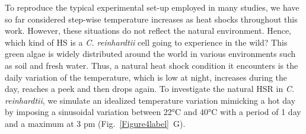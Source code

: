 \documentclass[oneside, 10pt, a4paper, twocolumn]{article}
\begin{document}


To reproduce the typical experimental set-up employed in many studies, we have so far considered step-wise temperature increases as heat shocks throughout this work. %
However, these situations do not reflect the natural environment.
Hence, which kind of HS is a \emph{C. reinhardtii} cell going to experience in the wild? %
This green algae is widely distributed around the world in various environments such as soil and fresh water. 
Thus, a natural heat shock condition it encounters is the daily variation of the temperature, which is low at night, increases during the day, reaches a peek and then drops again.
To investigate the natural HSR in \emph{C. reinhardtii}, we  simulate an idealized temperature variation mimicking  a hot day by imposing a sinusoidal variation between 22°C and 40°C with a period of 1 day and a maximum at 3 pm (Fig.~\ref{Figure4label}~G). 
\end{document}
